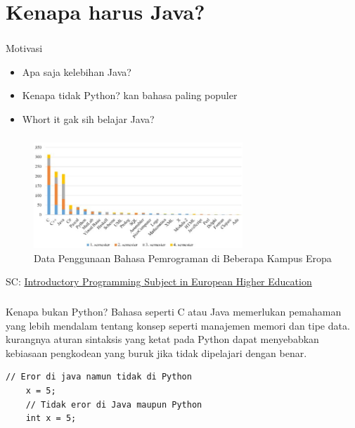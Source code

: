 \documentclass[aspectratio=169]{beamer}
\theoremstyle{definition}
\begin{document}
    \section{Kenapa harus Java?}
    \begin{frame}
        \frametitle{\insertsection}
        \begin{block}{Motivasi}
            \begin{itemize}[label=$\circ$]
                \item Apa saja kelebihan Java?
                \item Kenapa tidak Python? kan bahasa paling populer
                \item Whort it gak sih belajar Java?
            \end{itemize}
        \end{block}
    \end{frame}

    \begin{frame}
        \frametitle{\insertsection}
        \begin{figure}[h!]
            \centering
            \includegraphics[width=0.7\textwidth]{Data Bahasa Pemrograman}
            \caption{\small Data Penggunaan Bahasa Pemrograman di Beberapa Kampus Eropa}
        \end{figure}
        SC: \href{https://www.researchgate.net/publication/309176375_Introductory_Programming_Subject_in_European_Higher_Education}{Introductory Programming Subject in European Higher Education}
    \end{frame}

    \begin{frame}[fragile]
        \frametitle{\insertsection}
        \begin{alertblock}{Kenapa bukan Python?}
            Bahasa seperti C atau Java memerlukan pemahaman yang lebih mendalam tentang konsep seperti manajemen memori dan tipe data. kurangnya aturan sintaksis yang ketat pada Python dapat menyebabkan kebiasaan pengkodean yang buruk jika tidak dipelajari dengan benar.
        \end{alertblock}
        \begin{lstlisting}[caption={Masalah dalam deklarasi variabel}]
    // Eror di java namun tidak di Python
    x = 5;
    // Tidak eror di Java maupun Python
    int x = 5;
        \end{lstlisting}
    \end{frame}
\end{document}
